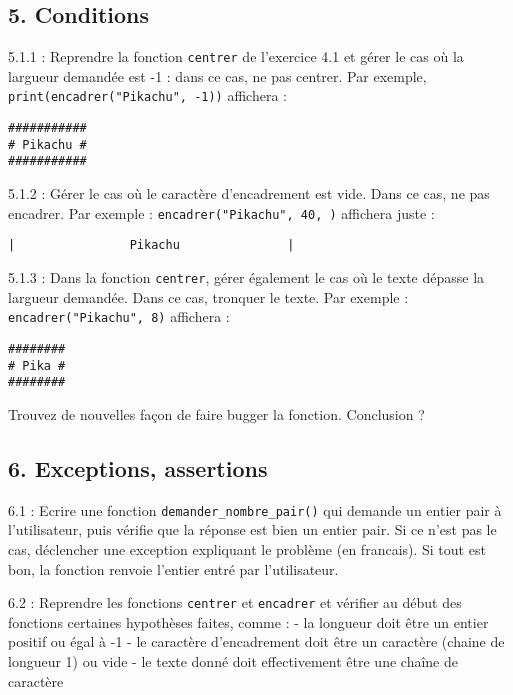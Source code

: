 \documentclass[]{article}
\begin{document}
\hypertarget{conditions}{%
\subsection{5. Conditions}\label{conditions}}

5.1.1 : Reprendre la fonction \texttt{centrer} de l'exercice 4.1 et
gérer le cas où la largueur demandée est -1 : dans ce cas, ne pas
centrer. Par exemple, \texttt{print(encadrer("Pikachu",\ -1))} affichera
:

\begin{verbatim}
###########
# Pikachu #
###########
\end{verbatim}

5.1.2 : Gérer le cas où le caractère d'encadrement est vide. Dans ce
cas, ne pas encadrer. Par exemple :
\texttt{encadrer("Pikachu",\ 40,\ \textquotesingle{}\textquotesingle{})}
affichera juste :

\begin{verbatim}
|                Pikachu               |
\end{verbatim}

5.1.3 : Dans la fonction \texttt{centrer}, gérer également le cas où le
texte dépasse la largueur demandée. Dans ce cas, tronquer le texte. Par
exemple : \texttt{encadrer("Pikachu",\ 8)} affichera :

\begin{verbatim}
########
# Pika #
########
\end{verbatim}

Trouvez de nouvelles façon de faire bugger la fonction. Conclusion ?

\hypertarget{exceptions-assertions}{%
\subsection{6. Exceptions, assertions}\label{exceptions-assertions}}

6.1 : Ecrire une fonction \texttt{demander\_nombre\_pair()} qui demande
un entier pair à l'utilisateur, puis vérifie que la réponse est bien un
entier pair. Si ce n'est pas le cas, déclencher une exception expliquant
le problème (en francais). Si tout est bon, la fonction renvoie l'entier
entré par l'utilisateur.

6.2 : Reprendre les fonctions \texttt{centrer} et \texttt{encadrer} et
vérifier au début des fonctions certaines hypothèses faites, comme : -
la longueur doit être un entier positif ou égal à -1 - le caractère
d'encadrement doit être un caractère (chaine de longueur 1) ou vide - le
texte donné doit effectivement être une chaîne de caractère
\end{document}
